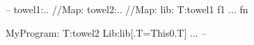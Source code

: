 --
towel1:.. //{Map:{} }
towel2:.. //{Map:{} }
lib:{
  T:towel1
  f1
  ...
  fn
  }

MyProgram:{
  T:towel2
  Lib:lib[.T=This0.T]
  ...
  }
-- 
